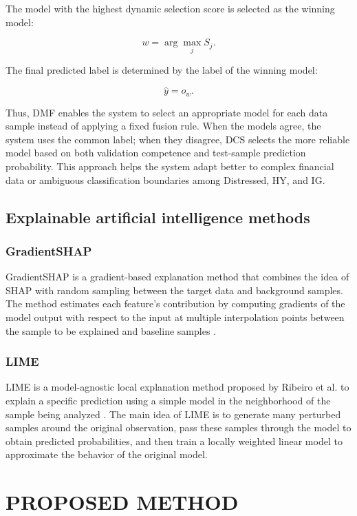 \documentclass[10pt,twoside]{article}
\begin{document}
The model with the highest dynamic selection score is selected as the winning model:

\begin{equation}
    w = \arg\max_{j} S_j.
\end{equation}

The final predicted label is determined by the label of the winning model:

\begin{equation}
    \hat{y} = o_w.
\end{equation}

Thus, DMF enables the system to select an appropriate model for each data sample instead of applying a fixed fusion rule. When the models agree, the system uses the common label; when they disagree, DCS selects the more reliable model based on both validation competence and test-sample prediction probability. This approach helps the system adapt better to complex financial data or ambiguous classification boundaries among Distressed, HY, and IG.

\subsection{Explainable artificial intelligence methods}
\subsubsection{GradientSHAP} 
GradientSHAP is a gradient-based explanation method that combines the idea of SHAP with random sampling between the target data and background samples. The method estimates each feature's contribution by computing gradients of the model output with respect to the input at multiple interpolation points between the sample to be explained and baseline samples \cite{lundberg_unified_2017, kokhlikyan_captum_2020}. 
\subsubsection{LIME} 
LIME is a model-agnostic local explanation method proposed by Ribeiro et al. to explain a specific prediction using a simple model in the neighborhood of the sample being analyzed \cite{ribeiro_why_2016}. The main idea of LIME is to generate many perturbed samples around the original observation, pass these samples through the model to obtain predicted probabilities, and then train a locally weighted linear model to approximate the behavior of the original model.

\section{PROPOSED METHOD}
\end{document}
